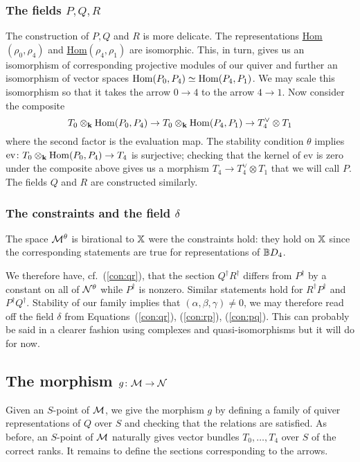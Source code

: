 \documentclass{amsart}
\theoremstyle{definition}
\begin{document}
\subsubsection{The fields $P, Q, R$}

The construction of $P,Q$ and $R$ is more delicate.
The representations \underline{Hom}$(\rho_0, \rho_4)$ and \underline{Hom}$(\rho_4, \rho_1)$ are isomorphic.
This, in turn, gives us an isomorphism of corresponding projective modules of our quiver and further an isomorphism of vector spaces $\operatorname{Hom}(P_0, P_4) \simeq \operatorname{Hom}(P_4, P_1)$.
We may scale this isomorphism so that it takes the arrow $0 \rightarrow 4$ to the arrow $4 \rightarrow 1$.
Now consider the composite $$T_0 \otimes_{\mathbf{k}} \operatorname{Hom}(P_0, P_4) \rightarrow T_0 \otimes_{\mathbf{k}} \operatorname{Hom}(P_4, P_1) \rightarrow T_4^\vee \otimes T_1$$ where the second factor is the evaluation map.
The stability condition $\theta$ implies $\text{ev} \colon T_0 \otimes_{\mathbf{k}} \operatorname{Hom}(P_0, P_4) \rightarrow T_4$ is surjective; checking that the kernel of ev is zero under the composite above gives us a morphism $T_4 \rightarrow T_4^\vee \otimes T_1$ that we will call $P$. 
The fields $Q$ and $R$ are constructed similarly.

\subsubsection{The constraints and the field $\delta$}

The space $\mathcal{M}^\theta$ is birational to $\mathbb{X}$ were the constraints hold: they hold on $\mathbb{X}$ since the corresponding statements are true for representations of $\mathbb{B} D_4$.

We therefore have, cf.\ (\ref{con:qr}), that the section $Q^\dagger R^\dagger$ differs from $P^\dagger$ by a constant on all of $\mathcal{N}^\theta$ while $P^\dagger$ is nonzero.
Similar statements hold for $R^\dagger P^\dagger$ and $P^\dagger Q^\dagger$.
Stability of our family implies that $(\alpha, \beta, \gamma) \neq 0$, we may therefore read off the field $\delta$ from Equations~(\ref{con:qr}), (\ref{con:rp}), (\ref{con:pq}). 
This can probably be said in a clearer fashion using complexes and quasi-isomorphisms but it will do for now.

\subsection{The morphism $g \colon \mathcal{M} \rightarrow \mathcal{N}$}

Given an $S$-point of $\mathcal{M}$, we give the morphism $g$ by defining a family of quiver representations of $Q$ over $S$ and checking that the relations are satisfied.
As before, an $S$-point of $\mathcal{M}$ naturally gives vector bundles $T_0, \ldots, T_4$ over $S$ of the correct ranks.
It remains to define the sections corresponding to the arrows.
\end{document}
